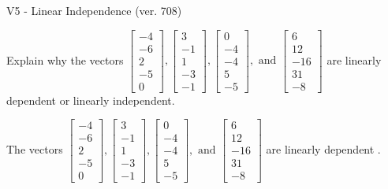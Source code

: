 \begin{exercise}
  \begin{exerciseTitle}V5 - Linear Independence (ver. 708)\end{exerciseTitle}
  \begin{exerciseStatement}
    Explain why the vectors \(\left[\begin{array}{r}
-4 \\
-6 \\
2 \\
-5 \\
0
\end{array}\right] , \left[\begin{array}{r}
3 \\
-1 \\
1 \\
-3 \\
-1
\end{array}\right] , \left[\begin{array}{r}
0 \\
-4 \\
-4 \\
5 \\
-5
\end{array}\right] , \text{ and } \left[\begin{array}{r}
6 \\
12 \\
-16 \\
31 \\
-8
\end{array}\right]\) are linearly dependent or linearly independent.	


  \end{exerciseStatement}
  \begin{exerciseAnswer}
   The vectors \(\left[\begin{array}{r}
-4 \\
-6 \\
2 \\
-5 \\
0
\end{array}\right] , \left[\begin{array}{r}
3 \\
-1 \\
1 \\
-3 \\
-1
\end{array}\right] , \left[\begin{array}{r}
0 \\
-4 \\
-4 \\
5 \\
-5
\end{array}\right] , \text{ and } \left[\begin{array}{r}
6 \\
12 \\
-16 \\
31 \\
-8
\end{array}\right]\) are 
  	 linearly dependent  .
  


  \end{exerciseAnswer}
\end{exercise}